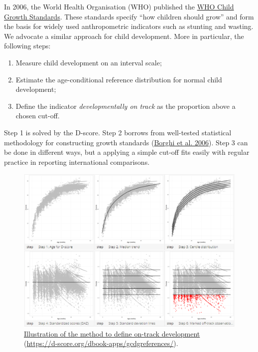 \documentclass[
]{book}
\providecommand{\tightlist}{%
  \setlength{\itemsep}{0pt}\setlength{\parskip}{0pt}}
\begin{document}
In 2006, the World Health Organisation (WHO) published the \href{https://www.who.int/childgrowth/publications/technical_report_pub/en/}{WHO Child Growth Standards}. These standards specify ``how children should grow'' and form the basis for widely used anthropometric indicators such as stunting and wasting. We advocate a similar approach for child development. More in particular, the following steps:

\begin{enumerate}
\def\labelenumi{\arabic{enumi}.}
\tightlist
\item
  Measure child development on an interval scale;
\item
  Estimate the age-conditional reference distribution for normal child development;
\item
  Define the indicator \emph{developmentally on track} as the proportion above a chosen cut-off.
\end{enumerate}

Step 1 is solved by the D-score. Step 2 borrows from well-tested statistical methodology for constructing growth standards (\protect\hyperlink{ref-borghi2006}{Borghi et al. 2006}). Step 3 can be done in different ways, but a applying a simple cut-off fits easily with regular practice in reporting international comparisons.

\begin{figure}

{\centering \includegraphics[width=1\linewidth]{fig/fig_7.1_full} 

}

\caption{\href{https://d-score.org/dbook-apps/gcdgreferences/}{Illustration of the method to define on-track development} (\url{https://d-score.org/dbook-apps/gcdgreferences/}).}\label{fig:dscorerefs}
\end{figure}
\end{document}
